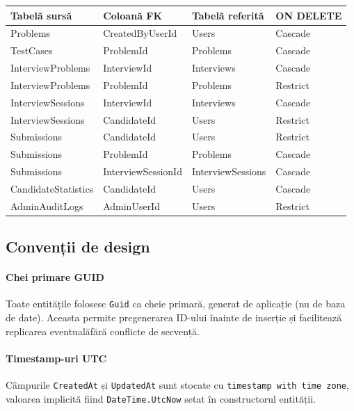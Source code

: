\begin{tabular}{llll}
\hline
\textbf{Tabelă sursă} & \textbf{Coloană FK} & \textbf{Tabelă referită} & \textbf{ON DELETE} \\
\hline
Problems              & CreatedByUserId       & Users            & Cascade  \\
TestCases             & ProblemId             & Problems         & Cascade  \\
InterviewProblems     & InterviewId           & Interviews       & Cascade  \\
InterviewProblems     & ProblemId             & Problems         & Restrict \\
InterviewSessions     & InterviewId           & Interviews       & Cascade  \\
InterviewSessions     & CandidateId           & Users            & Restrict \\
Submissions           & CandidateId           & Users            & Restrict \\
Submissions           & ProblemId             & Problems         & Cascade  \\
Submissions           & InterviewSessionId    & InterviewSessions & Cascade \\
CandidateStatistics   & CandidateId           & Users            & Cascade  \\
AdminAuditLogs        & AdminUserId           & Users            & Restrict \\
\hline
\end{tabular}

\subsection{Convenții de design}

\paragraph{Chei primare GUID}
Toate entitățile folosesc \texttt{Guid} ca cheie primară, generat de
aplicație (nu de baza de date). Aceasta permite pregenerarea ID-ului
înainte de inserție și facilitează replicarea eventualăfără conflicte
de secvență.

\paragraph{Timestamp-uri UTC}
Câmpurile \texttt{CreatedAt} și \texttt{UpdatedAt} sunt stocate cu
\texttt{timestamp with time zone}, valoarea implicită fiind
\texttt{DateTime.UtcNow} setat în constructorul entității.

